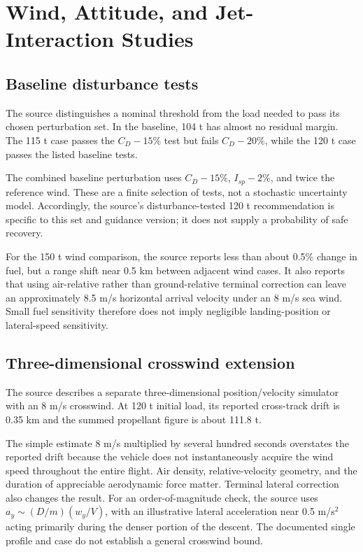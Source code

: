 \documentclass[11pt,a4paper]{article}
\begin{document}
\section{Wind, Attitude, and Jet-Interaction Studies}
\subsection{Baseline disturbance tests}
The source distinguishes a nominal threshold from the load needed to pass its chosen perturbation set. In the baseline, 104 t has almost no residual margin. The 115 t case passes the $C_D-15\%$ test but fails $C_D-20\%$, while the 120 t case passes the listed baseline tests.



The combined baseline perturbation uses $C_D-15\%$, $I_{sp}-2\%$, and twice the reference wind. These are a finite selection of tests, not a stochastic uncertainty model. Accordingly, the source's disturbance-tested 120 t recommendation is specific to this set and guidance version; it does not supply a probability of safe recovery.



For the 150 t wind comparison, the source reports less than about 0.5\% change in fuel, but a range shift near 0.5 km between adjacent wind cases. It also reports that using air-relative rather than ground-relative terminal correction can leave an approximately 8.5 m/s horizontal arrival velocity under an 8 m/s sea wind. Small fuel sensitivity therefore does not imply negligible landing-position or lateral-speed sensitivity.

\subsection{Three-dimensional crosswind extension}
The source describes a separate three-dimensional position/velocity simulator with an 8 m/s crosswind. At 120 t initial load, its reported cross-track drift is 0.35 km and the summed propellant figure is about 111.8 t.



The simple estimate $8$ m/s multiplied by several hundred seconds overstates the reported drift because the vehicle does not instantaneously acquire the wind speed throughout the entire flight. Air density, relative-velocity geometry, and the duration of appreciable aerodynamic force matter. Terminal lateral correction also changes the result. For an order-of-magnitude check, the source uses $a_y\sim(D/m)(w_y/V)$, with an illustrative lateral acceleration near 0.5 m/s$^2$ acting primarily during the denser portion of the descent. The documented single profile and case do not establish a general crosswind bound.
\end{document}
